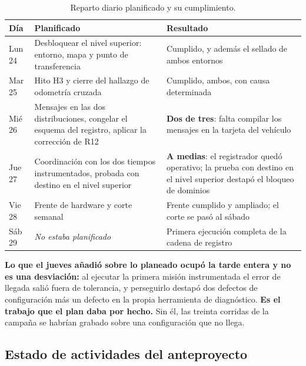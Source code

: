 \documentclass[12pt,letterpaper]{article}
\begin{document}
\begin{table}[H]
    \centering
    \small
    \caption{Reparto diario planificado y su cumplimiento.}
    \label{tab:dias}
    \begin{tabular}{@{}lp{5.6cm}p{5.0cm}@{}}
        \toprule
        \textbf{Día} & \textbf{Planificado} & \textbf{Resultado} \\ \midrule
        Lun 24 & Desbloquear el nivel superior: entorno, mapa y punto de transferencia & Cumplido, y además el sellado de ambos entornos \\ \addlinespace
        Mar 25 & Hito H3 y cierre del hallazgo de odometría cruzada & Cumplido, ambos, con causa determinada \\ \addlinespace
        Mié 26 & Mensajes en las dos distribuciones, congelar el esquema del registro, aplicar la corrección de R12 & \textbf{Dos de tres}: falta compilar los mensajes en la tarjeta del vehículo \\ \addlinespace
        Jue 27 & Coordinación con los dos tiempos instrumentados, probada con destino en el nivel superior & \textbf{A medias}: el registrador quedó operativo; la prueba con destino en el nivel superior destapó el bloqueo de dominios \\ \addlinespace
        Vie 28 & Frente de hardware y corte semanal & Frente cumplido y ampliado; el corte se pasó al sábado \\ \addlinespace
        Sáb 29 & \emph{No estaba planificado} & Primera ejecución completa de la cadena de registro \\ \bottomrule
    \end{tabular}
\end{table}

\textbf{Lo que el jueves añadió sobre lo planeado ocupó la tarde entera y no es una desviación:} al ejecutar la primera misión instrumentada el error de llegada salió fuera de tolerancia, y perseguirlo destapó dos defectos de configuración más un defecto en la propia herramienta de diagnóstico. \textbf{Es el trabajo que el plan daba por hecho.} Sin él, las treinta corridas de la campaña se habrían grabado sobre una configuración que no llega.

\subsection{Estado de actividades del anteproyecto}
\end{document}
